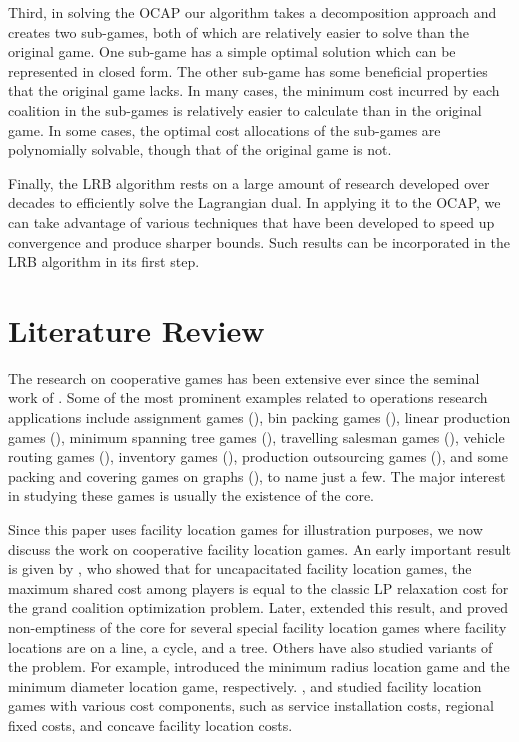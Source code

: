 \documentclass[ijoc,nonblindrev]{informs3} %
\begin{document}
Third, in solving the OCAP our algorithm takes a decomposition approach and creates two sub-games, both of which are relatively easier to solve than the original game. One sub-game has a simple optimal solution which can be represented in closed form. The other sub-game has some beneficial properties that the original game lacks.
In many cases, the minimum cost incurred by each coalition in the sub-games is relatively easier to calculate than in the original game. In some cases, the optimal cost allocations of the sub-games are polynomially solvable, though that of the original game is not.

Finally, the LRB algorithm rests on a large amount of research developed over decades to efficiently solve the Lagrangian dual.  In applying it to the OCAP, we can take advantage of various techniques that have been developed to speed up convergence and produce sharper bounds. Such results can be incorporated in the LRB algorithm in its first step.



\section{Literature Review}\label{sec:review}
The research on cooperative games has been extensive ever since the seminal work of \cite{shapley1952value}.  Some of the most prominent examples related to operations research applications include assignment games (\citealt{Shapley1971AssignmentGame,Martinez2013}), bin packing games (\citealt{Faigle1993,Liu2009}), linear production games (\citealt{Owen1975LinearProductionGames}), minimum spanning tree games (\citealt{Granot1981MinimumSpanningTreeGames}), travelling salesman games (\citealt{Tamir1989TSPGames,Potters1992}), vehicle routing games (\citealt{Gothe1996VehicleRoutingGames,Engevall2004}), inventory games (\citealt{Hartman2000, Chen2009, Chen2009b, He2012,Zhang2009}), production outsourcing games (\citealt{Aydinliyim2010,Cai2012}), and some packing and covering games on graphs (\citealt{Deng1999PackingAndCoveringGames}), to name just a few.
The major interest in studying these games is usually the existence of the core.

Since this paper uses facility location games for illustration purposes, we now discuss the work on  cooperative facility location games.  An early important result is given by \cite{Kolen1983FacilityLocationGame}, who showed that for uncapacitated facility location games, the maximum shared cost among players is equal to the classic LP relaxation cost for the grand coalition optimization problem.
Later, \cite{Goemans2000FacilityLocationGames} extended this result, and proved non-emptiness of the core for several special facility location games where facility locations are on a line, a cycle, and a tree.
Others have also studied variants of the problem. For example, \cite{Puerto2011,Puerto2012} introduced the minimum radius location game and the minimum diameter location game, respectively.
\cite{Xu2009}, \cite{Mallozzi2011} and \cite{Li2012UFLPConcave}  studied  facility location games with various cost components, such as service installation costs, regional fixed costs, and concave facility location costs.
\end{document}

